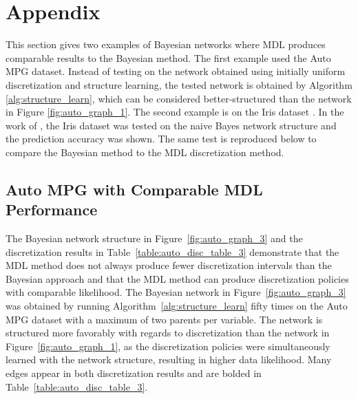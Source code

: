 




\section*{Appendix}
\label{sec:appendix}

This section gives two examples of Bayesian networks where MDL produces comparable results to the Bayesian method.
The first example used the Auto MPG dataset.
Instead of testing on the network obtained using initially uniform discretization and structure learning, the tested network is obtained by Algorithm \ref{alg:structure_learn}, which can be considered better-structured than the network in Figure \ref{fig:auto_graph_1}.
The second example is on the Iris dataset \citep{Lichman_2013}.
In the work of \cite{Friedman_1996}, the Iris dataset was tested on the naive Bayes network structure and the prediction accuracy was shown.
The same test is reproduced below to compare the Bayesian method to the MDL discretization method.

\subsection*{Auto MPG with Comparable MDL Performance}
The Bayesian network structure in Figure~\ref{fig:auto_graph_3} and the discretization results in Table~\ref{table:auto_disc_table_3} demonstrate that the MDL method does not always produce fewer discretization intervals than the Bayesian approach and that the MDL method can produce discretization policies with comparable likelihood.
The Bayesian network in Figure~\ref{fig:auto_graph_3} was obtained by running Algorithm~\ref{alg:structure_learn} fifty times on the Auto MPG dataset with a maximum of two parents per variable.
The network is structured more favorably with regards to discretization than the network in Figure~\ref{fig:auto_graph_1}, as the discretization policies were simultaneously learned with the network structure, resulting in higher data likelihood.
Many edges appear in both discretization results and are bolded in Table~\ref{table:auto_disc_table_3}.

